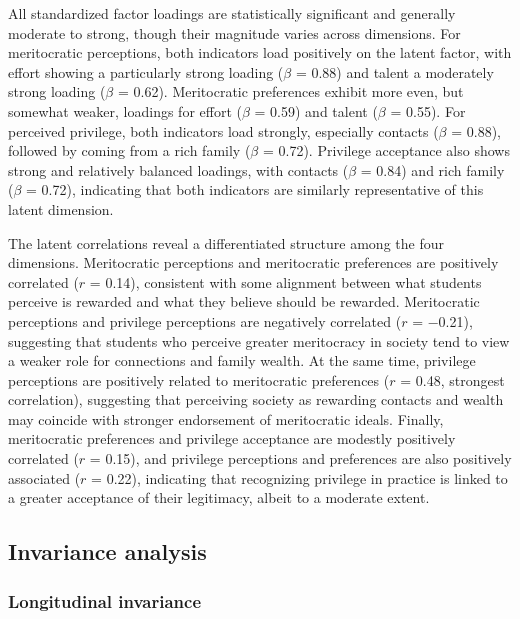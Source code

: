 \documentclass[
  13pt,
]{article}
\begin{document}
All standardized factor loadings are statistically significant and
generally moderate to strong, though their magnitude varies across
dimensions. For meritocratic perceptions, both indicators load
positively on the latent factor, with effort showing a particularly
strong loading (\(\beta\) = 0.88) and talent a moderately strong loading
(\(\beta\) = 0.62). Meritocratic preferences exhibit more even, but
somewhat weaker, loadings for effort (\(\beta\) = 0.59) and talent
(\(\beta\) = 0.55). For perceived privilege, both indicators load
strongly, especially contacts (\(\beta\) = 0.88), followed by coming
from a rich family (\(\beta\) = 0.72). Privilege acceptance also shows
strong and relatively balanced loadings, with contacts (\(\beta\) =
0.84) and rich family (\(\beta\) = 0.72), indicating that both
indicators are similarly representative of this latent dimension.

The latent correlations reveal a differentiated structure among the four
dimensions. Meritocratic perceptions and meritocratic preferences are
positively correlated (\(r\) = 0.14), consistent with some alignment
between what students perceive is rewarded and what they believe should
be rewarded. Meritocratic perceptions and privilege perceptions are
negatively correlated (\(r\) = −0.21), suggesting that students who
perceive greater meritocracy in society tend to view a weaker role for
connections and family wealth. At the same time, privilege perceptions
are positively related to meritocratic preferences (\(r\) = 0.48,
strongest correlation), suggesting that perceiving society as rewarding
contacts and wealth may coincide with stronger endorsement of
meritocratic ideals. Finally, meritocratic preferences and privilege
acceptance are modestly positively correlated (\(r\) = 0.15), and
privilege perceptions and preferences are also positively associated
(\(r\) = 0.22), indicating that recognizing privilege in practice is
linked to a greater acceptance of their legitimacy, albeit to a moderate
extent.

\subsection{Invariance analysis}\label{invariance-analysis}

\subsubsection{Longitudinal invariance}\label{longitudinal-invariance}
\end{document}
